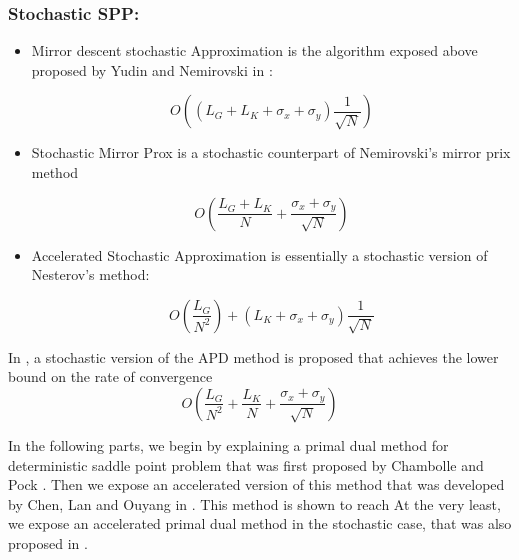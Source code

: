 \documentclass[12pt,reqno]{amsart}
\numberwithin{equation}{section}
\begin{document}
\subsubsection{ Stochastic SPP: }
\begin{itemize}
\item Mirror descent stochastic Approximation is the algorithm exposed above proposed by Yudin and Nemirovski in \cite{YudinNemirovski}:

$$
O((L_{G} + L_{K} + \sigma_{x} + \sigma_{y})\dfrac{1}{\sqrt{N}})
$$

\item Stochastic Mirror Prox is a stochastic counterpart of Nemirovski's mirror prix method

$$
O(\dfrac{L_{G} + L_{K}}{N} + \dfrac{\sigma_{x} + \sigma_{y}}{\sqrt{N}})
$$

\item Accelerated Stochastic Approximation is essentially a stochastic version of Nesterov's method:

$$
O(\dfrac{L_{G}}{N^{2}}) + (L_{K} + \sigma_{x} + \sigma_{y})\dfrac{1}{\sqrt{N}}
$$
\end{itemize}

In \cite{ChenLanOuyang}, a stochastic version of the APD method is proposed that achieves the lower bound on the rate 
of convergence
$$
O(\dfrac{L_{G}}{N^{2}} + \dfrac{L_{K}}{N} + \dfrac{\sigma_{x} + \sigma_{y}}{\sqrt{N}})
$$

In the following parts, we begin by explaining a primal dual method for deterministic saddle point problem that was first proposed by 
Chambolle and Pock \cite{ChambollePock}.
Then we expose an accelerated version of this method that was developed by Chen, Lan and Ouyang in \cite{ChenLanOuyang}.
This method is shown to reach 
At the very least, we expose an accelerated primal dual method in the stochastic case, that was also proposed in \cite{ChenLanOuyang}.

%
\end{document}
